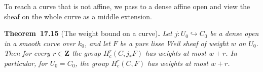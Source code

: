 \documentclass[11pt]{article}
\newenvironment{bpstatement}[2]{\par\addvspace{0.6\baselineskip}\noindent\textbf{#1}#2\textbf{.}\enspace\ignorespaces}
  {\par\addvspace{0.4\baselineskip}}
\newenvironment{bpstatementit}[2]{\begin{bpstatement}{#1}{#2}\itshape\ignorespaces}{\end{bpstatement}}
\begin{document}
\label{bp268}%
To reach a curve that is not affine, we pass to a dense affine open and view the sheaf on the whole curve as a middle extension.

\label{bp269}%
\begin{bpstatementit}{Theorem~17.15}{ (The weight bound on a curve)}
Let \(j:U_0\hookrightarrow C_0\) be a dense open in a smooth curve over \(k_0\), and let \(F\) be a pure lisse Weil sheaf of weight \(w\) on \(U_0\). Then for every \(r\in\mathbf Z\) the group \(H_c^r(C,j_*F)\) has weights at most \(w+r\). In particular, for \(U_0=C_0\), the group \(H_c^r(C,F)\) has weights at most \(w+r\).
\end{bpstatementit}
\end{document}
